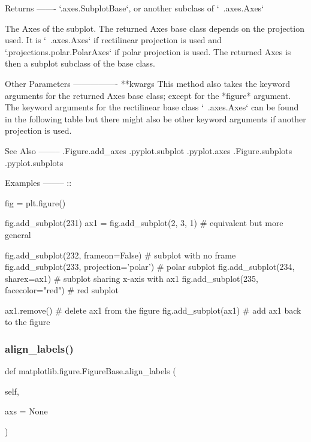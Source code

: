 \begin{DoxyVerb}
Returns
-------
`.axes.SubplotBase`, or another subclass of `~.axes.Axes`

    The Axes of the subplot. The returned Axes base class depends on
    the projection used. It is `~.axes.Axes` if rectilinear projection
    is used and `.projections.polar.PolarAxes` if polar projection
    is used. The returned Axes is then a subplot subclass of the
    base class.

Other Parameters
----------------
**kwargs
    This method also takes the keyword arguments for the returned Axes
    base class; except for the *figure* argument. The keyword arguments
    for the rectilinear base class `~.axes.Axes` can be found in
    the following table but there might also be other keyword
    arguments if another projection is used.


See Also
--------
.Figure.add_axes
.pyplot.subplot
.pyplot.axes
.Figure.subplots
.pyplot.subplots

Examples
--------
::

    fig = plt.figure()

    fig.add_subplot(231)
    ax1 = fig.add_subplot(2, 3, 1)  # equivalent but more general

    fig.add_subplot(232, frameon=False)  # subplot with no frame
    fig.add_subplot(233, projection='polar')  # polar subplot
    fig.add_subplot(234, sharex=ax1)  # subplot sharing x-axis with ax1
    fig.add_subplot(235, facecolor="red")  # red subplot

    ax1.remove()  # delete ax1 from the figure
    fig.add_subplot(ax1)  # add ax1 back to the figure
\end{DoxyVerb}
 \mbox{\label{classmatplotlib_1_1figure_1_1FigureBase_aecb3c8516a9b751cf15eb86480ef56a6}} 
\subsubsection{\texorpdfstring{align\+\_\+labels()}{align\_labels()}}
{\footnotesize\ttfamily def matplotlib.\+figure.\+Figure\+Base.\+align\+\_\+labels (\begin{DoxyParamCaption}\item[{}]{self,  }\item[{}]{axs = {\ttfamily None} }\end{DoxyParamCaption})}

